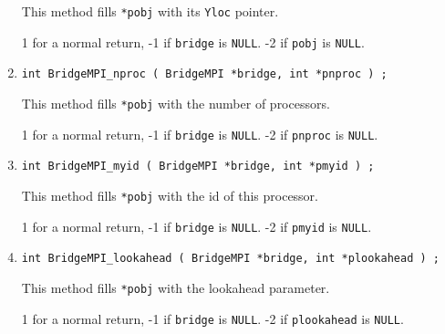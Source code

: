 \begin{enumerate}
This method fills \texttt{*pobj} with its \texttt{Yloc} pointer.
\par {}
1 for a normal return, 
-1 if \texttt{bridge} is \texttt{NULL}.
-2 if \texttt{pobj} is \texttt{NULL}.
\item
\begin{verbatim}
int BridgeMPI_nproc ( BridgeMPI *bridge, int *pnproc ) ;
\end{verbatim}
This method fills \texttt{*pobj} with the number of processors.
\par {}
1 for a normal return, 
-1 if \texttt{bridge} is \texttt{NULL}.
-2 if \texttt{pnproc} is \texttt{NULL}.
\item
\begin{verbatim}
int BridgeMPI_myid ( BridgeMPI *bridge, int *pmyid ) ;
\end{verbatim}
This method fills \texttt{*pobj} with the id of this processor.
\par {}
1 for a normal return, 
-1 if \texttt{bridge} is \texttt{NULL}.
-2 if \texttt{pmyid} is \texttt{NULL}.
\item
\begin{verbatim}
int BridgeMPI_lookahead ( BridgeMPI *bridge, int *plookahead ) ;
\end{verbatim}
This method fills \texttt{*pobj} with the lookahead parameter.
\par {}
1 for a normal return, 
-1 if \texttt{bridge} is \texttt{NULL}.
-2 if \texttt{plookahead} is \texttt{NULL}.
\end{enumerate}
\par
